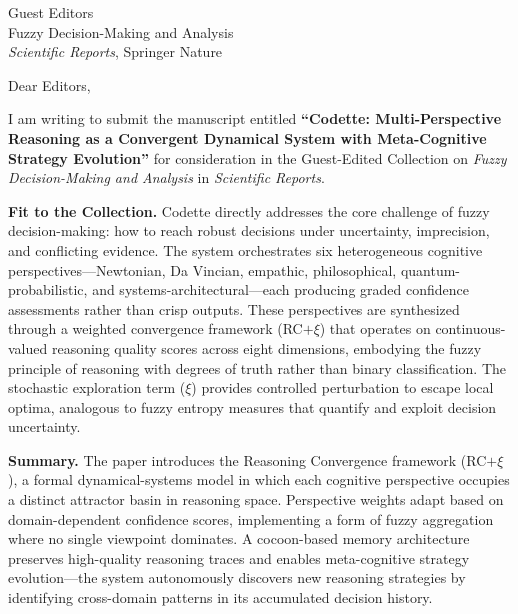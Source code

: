 \documentclass[11pt]{letter}
\begin{document}
\begin{letter}{Guest Editors\\
Fuzzy Decision-Making and Analysis\\
\emph{Scientific Reports}, Springer Nature}

\opening{Dear Editors,}

I am writing to submit the manuscript entitled \textbf{``Codette: Multi-Perspective Reasoning as a Convergent Dynamical System with Meta-Cognitive Strategy Evolution''} for consideration in the Guest-Edited Collection on \emph{Fuzzy Decision-Making and Analysis} in \emph{Scientific Reports}.

\textbf{Fit to the Collection.} Codette directly addresses the core challenge of fuzzy decision-making: how to reach robust decisions under uncertainty, imprecision, and conflicting evidence. The system orchestrates six heterogeneous cognitive perspectives---Newtonian, Da Vincian, empathic, philosophical, quantum-probabilistic, and systems-architectural---each producing graded confidence assessments rather than crisp outputs. These perspectives are synthesized through a weighted convergence framework (RC$+\xi$) that operates on continuous-valued reasoning quality scores across eight dimensions, embodying the fuzzy principle of reasoning with degrees of truth rather than binary classification. The stochastic exploration term ($\xi$) provides controlled perturbation to escape local optima, analogous to fuzzy entropy measures that quantify and exploit decision uncertainty.

\textbf{Summary.} The paper introduces the Reasoning Convergence framework (RC$+\xi$), a formal dynamical-systems model in which each cognitive perspective occupies a distinct attractor basin in reasoning space. Perspective weights adapt based on domain-dependent confidence scores, implementing a form of fuzzy aggregation where no single viewpoint dominates. A cocoon-based memory architecture preserves high-quality reasoning traces and enables meta-cognitive strategy evolution---the system autonomously discovers new reasoning strategies by identifying cross-domain patterns in its accumulated decision history.


\end{letter}
\end{document}
